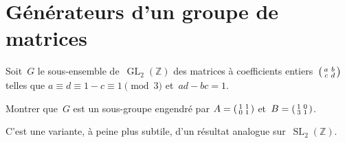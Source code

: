 
\section{Générateurs d'un groupe de matrices}

Soit~$G$ le sous-ensemble de~$\operatorname{GL}_2(\mathbb{Z})$
des matrices à coefficients entiers~$ \begin{psmallmatrix} a&b\\c&d \end{psmallmatrix}$ telles que
$a\equiv d \equiv 1-c \equiv 1 \pmod{3}$ et~$ad-bc=1$.

Montrer que~$G$ est un sous-groupe engendré par
$A = \begin{psmallmatrix} 1&1\\0&1 \end{psmallmatrix}$
et~$B = \begin{psmallmatrix} 1&0\\3&1 \end{psmallmatrix}$.

\begin{em}
  C'est une variante, à peine plus subtile, d'un résultat analogue sur~$\operatorname{SL}_2(\mathbb{Z})$.
\end{em}

